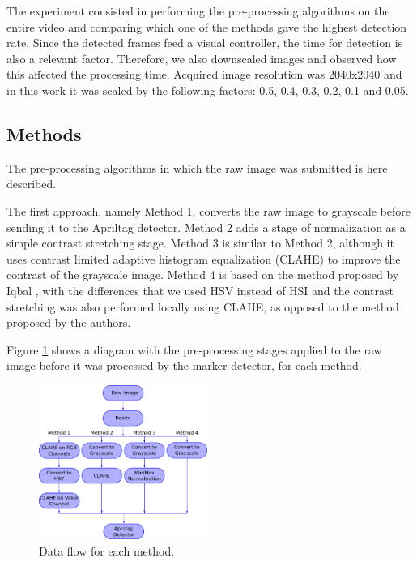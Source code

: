\documentclass[conference, letterpaper]{IEEEtran}
\begin{document}
The experiment consisted in performing the pre-processing algorithms on the
entire video and comparing which one of the methods gave the highest detection
rate. Since the detected frames feed a visual controller, the time for
detection is also a relevant factor. Therefore, we also downscaled images and
observed how this affected the processing time. Acquired image resolution was
2040x2040 and in this work it was scaled by the following factors: 0.5, 0.4, 0.3, 0.2,
0.1 and 0.05.

\subsection{Methods}

The pre-processing algorithms in which the raw image was submitted is here described. 

The first approach, namely Method 1, converts the raw image to grayscale
before sending it to the Apriltag detector. Method 2 adds a stage of
normalization as a simple contrast stretching stage. Method 3 is similar to
Method 2, although it uses contrast limited adaptive histogram equalization (CLAHE)
\cite{zuiderveld1994contrast} to improve the contrast of the grayscale image.
Method 4 is based on the method proposed by Iqbal \cite{iqbal2007underwater},
with the differences that we used HSV instead of HSI and the contrast stretching was
also performed locally using CLAHE, as opposed to the method proposed by
the authors.

Figure \ref{fig:methods_flow} shows a diagram with the pre-processing stages
applied to the raw image before it was processed by the marker detector, for each
method. 

\begin{figure}[!htpb]
    \centering
    \includegraphics[width=0.49\textwidth]{./fig/processing_flow3.png}
    \caption{Data flow for each method.}
    \label{fig:methods_flow}
\end{figure}
\end{document}
